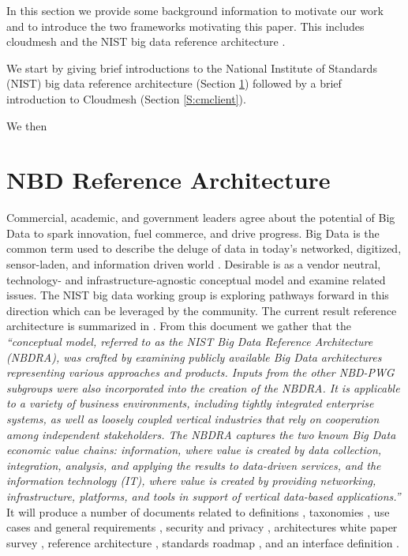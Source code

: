 In this section we provide some background information to motivate our
work and to introduce the two frameworks motivating this paper. This
includes cloudmesh \cite{las12-cloud} \cite{github-cloudmesh-client}
and the NIST big data reference architecture \cite{nist-bd}.

We start by giving brief introductions to the National Institute of
Standards (NIST) big data reference architecture (Section \ref{S:NBDarch}) followed
by a brief introduction to Cloudmesh (Section \ref{S:cmclient}).


We then  

\section{NBD Reference Architecture}
\label{S:NBDarch}

Commercial, academic, and government leaders agree about the potential
of {\em} Big Data to spark innovation, fuel commerce, and drive
progress. Big Data is the common term used to describe the deluge of
data in today’s networked, digitized, sensor-laden, and information
driven world \cite{nist-bd}. Desirable is as a vendor neutral,
technology- and infrastructure-agnostic conceptual model and examine
related issues.  The NIST big data working group is exploring pathways
forward in this direction which can be leveraged by the community. The
current result reference architecture is summarized in
\cite{nist-bd}. From this document we gather that the {\it
  ``conceptual model, referred to as the NIST Big Data Reference
  Architecture (NBDRA), was crafted by examining publicly available
  Big Data architectures representing various approaches and
  products. Inputs from the other NBD-PWG subgroups were also
  incorporated into the creation of the NBDRA. It is applicable to a
  variety of business environments, including tightly integrated
  enterprise systems, as well as loosely coupled vertical industries
  that rely on cooperation among independent stakeholders. The NBDRA
  captures the two known Big Data economic value chains: information,
  where value is created by data collection, integration, analysis,
  and applying the results to data-driven services, and the
  information technology (IT), where value is created by providing
  networking, infrastructure, platforms, and tools in support of
  vertical data-based applications.''}  It will produce a number of
documents related to definitions \cite{??}, taxonomies \cite{??}, use
cases and general requirements \cite{??}, security and privacy
\cite{??}, architectures white paper survey \cite{??}, reference
architecture \cite{??}, standards roadmap \cite{??}, and an interface
definition \cite{??}.

